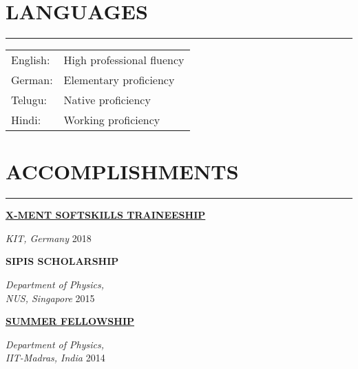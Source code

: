 {\begin{minipage}[t][\textheight-2\fboxsep-2\fboxrule][t]{0.28\textwidth}
\begin{flushleft}
\section*{LANGUAGES} \vskip -3.5mm {\color{cyan}\hrule} \vskip 3.5mm

\begin{tabular}{l l}
	English:& High professional fluency\\
	German:	& Elementary proficiency \\
	Telugu:	& Native proficiency  \\
	Hindi: & Working proficiency \\
\end{tabular}

\section*{ACCOMPLISHMENTS} \vskip -3.5mm {\color{cyan}\hrule} \vskip 3.5mm
\textbf{\uppercase{\href{https://www.peba.kit.edu/1009.php}{X-Ment Softskills Traineeship}}}  \par
\textit{KIT, Germany} \hfill 2018


\textbf{\uppercase{SIPIS Scholarship}} \par
\textit{Department of Physics, \\ NUS, Singapore}  \hfill 2015

\textbf{{\href{https://sfp.iitm.ac.in/}{\uppercase{Summer Fellowship}}}} \par
\textit{Department of Physics,\\ IIT-Madras, India} \hfill 2014


\end{flushleft}
\end{minipage}}
